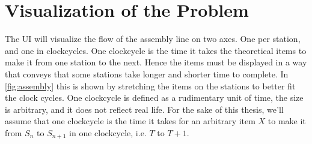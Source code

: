 \documentclass[12pt,a4paper]{report}
\begin{document}
\section{Visualization of the Problem}
    The UI will visualize the flow of the assembly line on two axes. One per station, and one in clockcycles. One clockcycle is the time it takes the theoretical items to make it from one station to the next. Hence the items must be displayed in a way that conveys that some stations take longer and shorter time to complete. In \autoref{fig:assembly} this is shown by stretching the items on the stations to better fit the clock cycles. One clockcycle is defined as a rudimentary unit of time, the size is arbitrary, and it does not reflect real life. For the sake of this thesis, we'll assume that one clockcycle is the time it takes for an arbitrary item $X$ to make it from $S_n$ to $S_{n+1}$ in one clockcycle, i.e. $T$ to $T + 1$.
\end{document}
